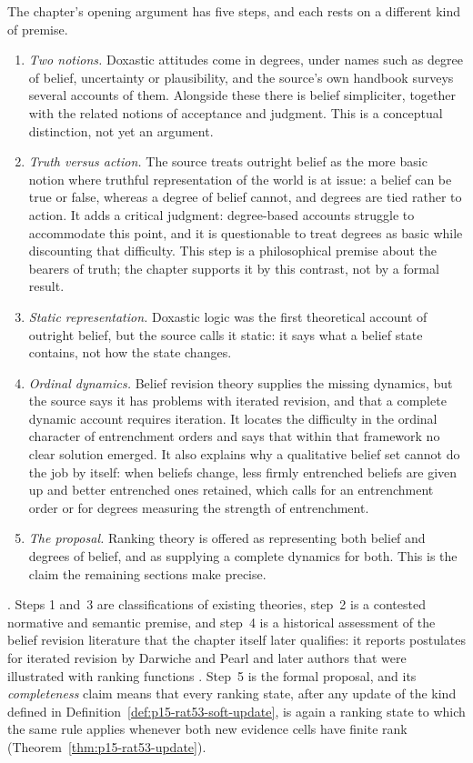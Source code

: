 The chapter's opening argument has five steps, and each rests on a
different kind of premise.
\begin{enumerate}
\item \emph{Two notions.}  Doxastic attitudes come in degrees, under names
 such as degree of belief, uncertainty or plausibility, and the source's
 own handbook surveys several accounts of them.  Alongside these there is
 belief simpliciter, together with the related notions of acceptance and
 judgment.  This is a conceptual distinction, not yet an argument.
\item \emph{Truth versus action.}  The source treats outright belief as the
 more basic notion where truthful representation of the world is at
 issue: a belief can be true or false, whereas a degree of belief cannot,
 and degrees are tied rather to action.  It adds a critical judgment:
 degree-based accounts struggle to accommodate this point, and it is
 questionable to treat degrees as basic while discounting that difficulty.
 This step is a philosophical premise about the bearers of truth; the
 chapter supports it by this contrast, not by a formal result.
\item \emph{Static representation.}  Doxastic logic was the first
 theoretical account of outright belief, but the source calls it static:
 it says what a belief state contains, not how the state changes.
\item \emph{Ordinal dynamics.}  Belief revision theory supplies the
 missing dynamics, but the source says it has problems with iterated
 revision, and that a complete dynamic account requires iteration.  It
 locates the difficulty in the ordinal character of entrenchment orders
 and says that within that framework no clear solution emerged.  It also
 explains why a qualitative belief set cannot do the job by itself: when
 beliefs change, less firmly entrenched beliefs are given up and better
 entrenched ones retained, which calls for an entrenchment order or for
 degrees measuring the strength of entrenchment.
\item \emph{The proposal.}  Ranking theory is offered as representing
 both belief and degrees of belief, and as supplying a complete dynamics
 for both.  This is the claim the remaining sections make precise.
\end{enumerate}
\parencite[pp.~337--338, 341]{KernIsbernerSkovgaardOlsenSpohn2021Ranking}.
Steps 1 and~3 are classifications of existing theories, step~2 is a
contested normative and semantic premise, and step~4 is a historical
assessment of the belief revision literature that the chapter itself later
qualifies: it reports postulates for iterated revision by Darwiche and Pearl
and later authors that were illustrated with ranking functions
\parencite[p.~342]{KernIsbernerSkovgaardOlsenSpohn2021Ranking}.
Step~5 is the formal proposal, and its \emph{completeness} claim means that
every ranking state, after any update of the kind defined in
Definition~\ref{def:p15-rat53-soft-update}, is again a ranking state to which
the same rule applies whenever both new evidence cells have finite rank
(Theorem~\ref{thm:p15-rat53-update}).

